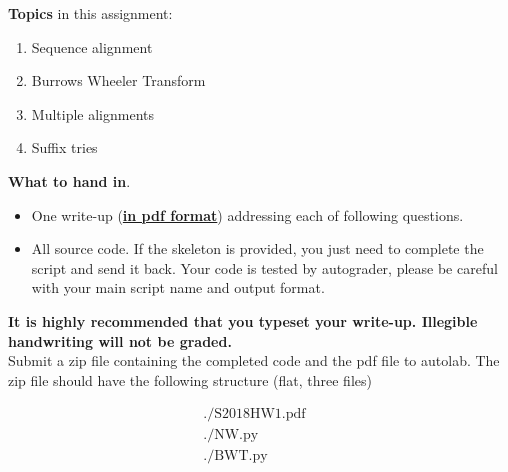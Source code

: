 \noindent 
{\bf Topics} in this assignment: 
\begin{enumerate}
\item Sequence alignment
\item Burrows Wheeler Transform
\item Multiple alignments
\item Suffix tries
\end{enumerate}
\vspace{0.2in}


\noindent 
{\bf What to hand in}. 
\begin{itemize}
\item One write-up (\underline{\textbf{in pdf format}}) addressing each of following questions.
\item All source code. If the skeleton is provided, you just need to complete the script and send it back. Your code is tested by autograder, please be careful with your main script name and output format.
\end{itemize}

\textbf{It is highly recommended that you typeset your write-up. Illegible handwriting will not be graded.}\\

Submit a zip file containing the completed code and the
pdf file to autolab. The zip file should have the following structure (flat, three files)

\[
  \begin{array}{lllll}
    ./\text{S2018HW1.pdf}&  \\
    ./\text{NW.py}& \\
    ./\text{BWT.py}&
  \end{array}
\]
